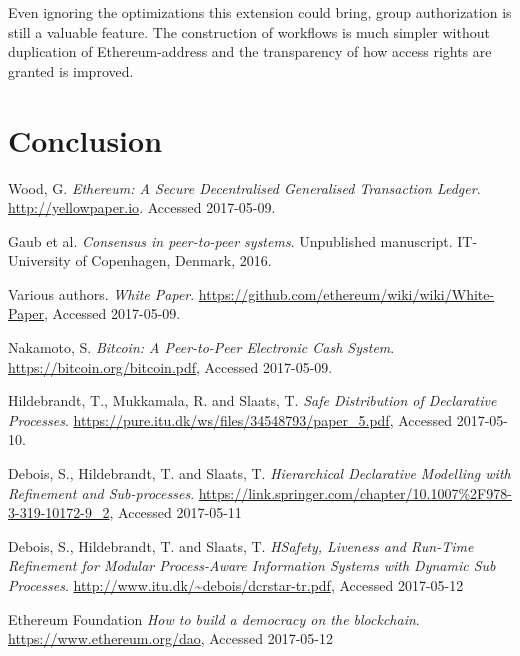 \documentclass{article}
\begin{document}
		Even ignoring the optimizations this extension could bring, group authorization is still a valuable feature.
		The construction of workflows is much simpler without duplication of Ethereum-address and the transparency of how access rights are granted is improved.
		
	\section{Conclusion}

	\pagebreak
	
	\begin{thebibliography}{99}

		Wood, G.
		\textit{Ethereum: A Secure Decentralised Generalised Transaction Ledger}. 
		\url{http://yellowpaper.io}.
		Accessed 2017-05-09.

		Gaub et al.
		\textit{Consensus in peer-to-peer systems}.
		Unpublished manuscript.
		IT-University of Copenhagen,
		Denmark,
		2016.

		Various authors.
		\textit{White Paper}.
		\url{https://github.com/ethereum/wiki/wiki/White-Paper},
		Accessed 2017-05-09.

		Nakamoto, S.
		\textit{Bitcoin: A Peer-to-Peer Electronic Cash System}.
		\url{https://bitcoin.org/bitcoin.pdf},
		Accessed 2017-05-09.

		Hildebrandt, T., Mukkamala, R. and Slaats, T.
		\textit{Safe Distribution of Declarative Processes}.
		\url{https://pure.itu.dk/ws/files/34548793/paper_5.pdf},
		Accessed 2017-05-10.

		Debois, S., Hildebrandt, T. and Slaats, T.
		\textit{Hierarchical Declarative Modelling with Refinement and Sub-processes}.
		\url{https://link.springer.com/chapter/10.1007%2F978-3-319-10172-9_2},
		Accessed 2017-05-11

		Debois, S., Hildebrandt, T. and Slaats, T.
		\textit{HSafety, Liveness and Run-Time Refinement for Modular Process-Aware Information Systems with Dynamic Sub Processes}.
		\url{http://www.itu.dk/~debois/dcrstar-tr.pdf},
		Accessed 2017-05-12

		
		Ethereum Foundation
		\textit{How to build a democracy on the blockchain}.
		\url{https://www.ethereum.org/dao},
		Accessed 2017-05-12

	\end{thebibliography}
\end{document}
